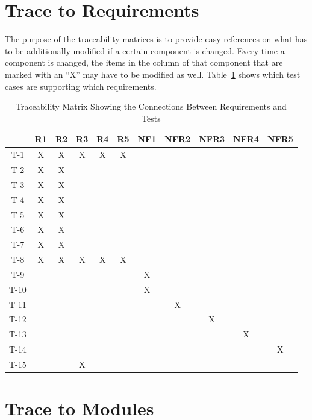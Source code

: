 \documentclass[12pt, titlepage]{article}
\begin{document}
		
\section{Trace to Requirements}


The purpose of the traceability matrices is to provide easy references on what
has to be additionally modified if a certain component is changed.  Every time a
component is changed, the items in the column of that component that are marked
with an ``X'' may have to be modified as well.  Table~\ref{Table:R_trace} shows 
which test cases are supporting which requirements.



\begin{table}[H]
\centering
\begin{tabular}{||c||c|c|c|c|c|c|c|c|c|c||}
\hline
	& R1 & R2 & R3 & R4 & R5 & NF1 & NFR2 & NFR3 & NFR4 & NFR5 \\
\hline
T-1        	& X& X& X& X& X& & & & & \\
\hline
T-2			& X& X& & & & & & & &\\
\hline
T-3        	& X& X& & & & & & & &\\
\hline
T-4			& X& X& & & & & & &  &\\
\hline
T-5       	& X& X& & & & & & & &\\
\hline
T-6			& X& X& & & & & & & &\\
\hline
T-7        	& X& X& & & & & & & &\\
\hline
T-8			& X& X&X & X& X& & & & &\\ 
\hline
T-9        	& & & & & &X & & & &\\
\hline
T-10 		& & & & & &X & & & &\\
\hline
T-11        	& & & & & & &X & & &\\
\hline
T-12			& & & & & & & &X & &\\ 
\hline
T-13        	& & & & & & & & &X &\\
\hline
T-14			& & & & & & & & & &X\\
\hline
T-15        	& & &X & & & & & & &\\
\hline

\end{tabular}
\caption{Traceability Matrix Showing the Connections Between Requirements and 
Tests}
\label{Table:R_trace}
\end{table}
		
\section{Trace to Modules}	
\end{document}
